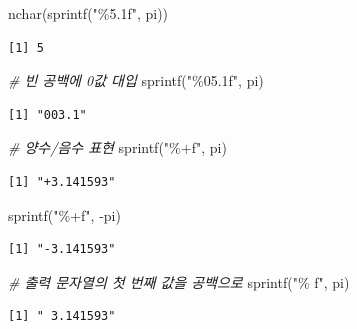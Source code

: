 \documentclass[
  11pt,
]{krantz}
\newenvironment{Shaded}{\begin{snugshade}}{\end{snugshade}}
\newcommand{\CommentTok}[1]{\textcolor[rgb]{0.37,0.37,0.37}{\textit{#1}}}
\newcommand{\FunctionTok}[1]{\textcolor[rgb]{0,0,0}{#1}}
\newcommand{\NormalTok}[1]{#1}
\newcommand{\SpecialCharTok}[1]{\textcolor[rgb]{0,0,0}{#1}}
\newcommand{\StringTok}[1]{\textcolor[rgb]{0.5,0.5,0.5}{#1}}
\begin{document}
\begin{Shaded}
\begin{Highlighting}[]
\FunctionTok{nchar}\NormalTok{(}\FunctionTok{sprintf}\NormalTok{(}\StringTok{"\%5.1f"}\NormalTok{, pi))}
\end{Highlighting}
\end{Shaded}

\begin{verbatim}
[1] 5
\end{verbatim}

\begin{Shaded}
\begin{Highlighting}[]
\CommentTok{\# 빈 공백에 0값 대입}
\FunctionTok{sprintf}\NormalTok{(}\StringTok{"\%05.1f"}\NormalTok{, pi)}
\end{Highlighting}
\end{Shaded}

\begin{verbatim}
[1] "003.1"
\end{verbatim}

\begin{Shaded}
\begin{Highlighting}[]
\CommentTok{\# 양수/음수 표현}
\FunctionTok{sprintf}\NormalTok{(}\StringTok{"\%+f"}\NormalTok{, pi)}
\end{Highlighting}
\end{Shaded}

\begin{verbatim}
[1] "+3.141593"
\end{verbatim}

\begin{Shaded}
\begin{Highlighting}[]
\FunctionTok{sprintf}\NormalTok{(}\StringTok{"\%+f"}\NormalTok{, }\SpecialCharTok{{-}}\NormalTok{pi)}
\end{Highlighting}
\end{Shaded}

\begin{verbatim}
[1] "-3.141593"
\end{verbatim}

\begin{Shaded}
\begin{Highlighting}[]
\CommentTok{\# 출력 문자열의 첫 번째 값을 공백으로}
\FunctionTok{sprintf}\NormalTok{(}\StringTok{"\% f"}\NormalTok{, pi) }
\end{Highlighting}
\end{Shaded}

\begin{verbatim}
[1] " 3.141593"
\end{verbatim}
\end{document}
